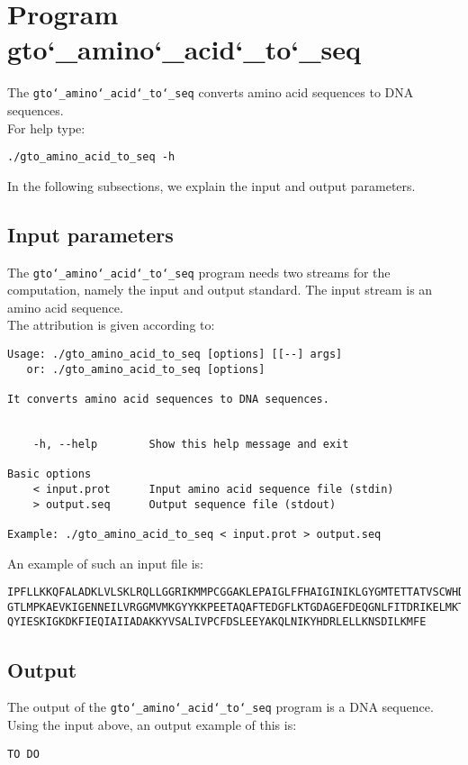 \section{Program gto\char`_amino\char`_acid\char`_to\char`_seq}
The \texttt{gto\char`_amino\char`_acid\char`_to\char`_seq} converts amino acid sequences to DNA sequences.\\
For help type:
\begin{lstlisting}
./gto_amino_acid_to_seq -h
\end{lstlisting}

In the following subsections, we explain the input and output parameters.

\subsection*{Input parameters}

The \texttt{gto\char`_amino\char`_acid\char`_to\char`_seq} program needs two streams for the computation, namely the input and output standard. The input stream is an amino acid sequence.\\
The attribution is given according to:
\begin{lstlisting}
Usage: ./gto_amino_acid_to_seq [options] [[--] args]
   or: ./gto_amino_acid_to_seq [options]

It converts amino acid sequences to DNA sequences.


    -h, --help        Show this help message and exit

Basic options
    < input.prot      Input amino acid sequence file (stdin)
    > output.seq      Output sequence file (stdout)

Example: ./gto_amino_acid_to_seq < input.prot > output.seq
\end{lstlisting}
An example of such an input file is:
\begin{lstlisting}
IPFLLKKQFALADKLVLSKLRQLLGGRIKMMPCGGAKLEPAIGLFFHAIGINIKLGYGMTETTATVSCWHDFQFNPNSI
GTLMPKAEVKIGENNEILVRGGMVMKGYYKKPEETAQAFTEDGFLKTGDAGEFDEQGNLFITDRIKELMKTSNGKYIAP
QYIESKIGKDKFIEQIAIIADAKKYVSALIVPCFDSLEEYAKQLNIKYHDRLELLKNSDILKMFE
\end{lstlisting}

\subsection*{Output}

The output of the \texttt{gto\char`_amino\char`_acid\char`_to\char`_seq} program is a DNA sequence.\\

Using the input above, an output example of this is:

\begin{lstlisting}
TO DO
\end{lstlisting}
